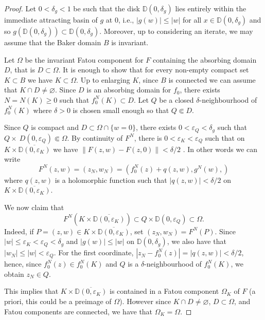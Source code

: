 \documentclass[a4paper, 12pt, twoside]{amsart}
\theoremstyle{definition}
\numberwithin{equation}{section}
\newcommand{\D}{{\mathbb D}}
\renewcommand{\epsilon}{\varepsilon}
\renewcommand{\emptyset}{\varnothing}
\begin{document}
\begin{proof} Let $0 < \delta_g < 1$ be such that the disk $\D(0,\delta_g)$ lies entirely within the immediate attracting basin of $g$ at $0$, i.e., $|g(w)|\le|w|$ for all $x\in \D(0,\delta_g)$ and so $g(\D(0,\delta_g)) \subset \D(0,\delta_g)$. Moreover, up to considering an iterate, we may assume that the Baker domain $B$ is invariant.

Let $\Omega$ be the invariant Fatou component for $F$ containing the absorbing domain $D$, that is $D\subset\Omega$. It is enough to show that for every non-empty compact set $K\subset B$ we have $K\subset\Omega$.  
Up to enlarging $K$, since $B$ is connected we can assume that $K\cap D\neq\emptyset$. 
Since $D$ is an absorbing domain for $f_0$, there exists $N=N( K)\ge 0$ such that $f_0^N(K)\subset D$. Let $Q$ be a closed $\delta$-neighbourhood of $f_0^N(K)$ where $\delta>0$ is chosen small enough so that $Q\Subset D$.

 Since  $Q$ is compact and $D\subset\Omega\cap\{w=0\}$, there exists $0<\epsilon_Q<\delta_g$ such that $ Q\times\ D(0,\epsilon_Q)\Subset \Omega$.
By continuity of $F^N$, there is  $0<\epsilon_K<\epsilon_Q$ such that on $K\times \overline{\D(0, \epsilon_K)}$ we have $\|F(z,w)-F(z,0)\|<\delta/2$ .
In other words we can write 
\begin{equation}\label{eq:2.3}
F^N(z,w)=(z_N, w_N)=(f_0^N(z)+ q(z,w), g^N (w),)
\end{equation}
where $q(z,w)$ is a holomorphic function such that $|q(z,w)|<\delta/2$  on $K\times \overline{\D(0, \epsilon_K)}$.

We now claim that 
$$
F^N(K\times\overline{\D(0, \epsilon_K)})\subset Q\times\D(0, \epsilon_Q)\subset \Omega.
$$
Indeed, if $P=(z,w)\in K\times\overline{\D(0, \epsilon_K)}$, set $(z_N, w_N)= F^N(P)$. Since $|w|\le\epsilon_K<\epsilon_Q<\delta_g$ and $|g(w)|\le|w|$ on $\D(0,\delta_g)$, we also have that  $|w_N|\le|w|<\epsilon_Q$.  
For the first coordinate,  $|z_N-f_0^N(z)|=|q(z,w)|<\delta/2$, hence, since $f_0^N(z)\in f_0^N(K) $ and $Q$ is a $\delta$-neighbourhood of $f_0^N( K)$, we obtain $z_N\in Q$.

This implies that  $K\times \overline{\D(0, \epsilon_K)}$ is contained in a Fatou component $\Omega_K$ of $F$ (a priori, this could be a preimage of $\Omega$). However since $K\cap D\neq\emptyset$, $D\subset\Omega$, and Fatou components are connected, we have that $\Omega_K=\Omega$.

\end{proof}
\end{document}
